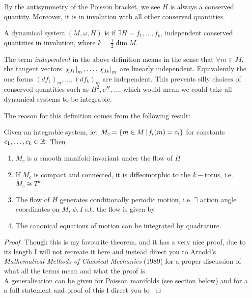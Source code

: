 \documentclass{article}
\begin{document}
\begin{example}
By the antisymmetry of the Poisson bracket, we see $H$ is always a conserved quantity. Moreover, it is in involution with all other conserved quantities. 
\end{example}

\begin{definition}[Integrable]
A dynamical system $(M,\omega,H)$ is  if $\exists H=f_1, \dots, f_k$, independent conserved quantities in involution, where $k= \frac{1}{2}\dim M$.
\end{definition}

\begin{remark}
The term \textit{independent} in the above definition means in the sense that $\forall m \in M$, the tangent vectors $\left. \chi_{f_1} \right\rvert_{m}, \dots, \left. \chi_{f_k} \right\rvert_{m} $ are linearly independent. Equivalently the one forms $(df_1)_m, \dots, (df_k)_m$ are independent. This prevents silly choices of conserved quantities such as $H^2, e^H, \dots$, which would mean we could take all dynamical systems to be integrable. 
\end{remark}

The reason for this definition comes from the following result:

\begin{theorem}
Given an integrable system, let $M_c = \left\{ m \in M \, | \, f_i(m) = c_i \right\}$ for constants $c_1, \dots, c_k \in \mathbb{R}$. Then 
\begin{enumerate}
    \item $M_c$ is a smooth manifold invariant under the flow of $H$
    \item If $M_c$ is compact and connected, it is diffeomorphic to the $k-$torus, i.e. $M_c \cong T^k$
    \item The flow of $H$ generates conditionally periodic motion, i.e. $\exists$ action angle coordinates on $M$, $\phi,I$ s.t. the flow is given by 
    \item The canonical equations of motion can be integrated by quadrature.
\end{enumerate}
\end{theorem}
\begin{proof}
Though this is my favourite theorem, and it has a very nice proof, due to its length I will not recreate it here and instead direct you to Arnold's \textit{Mathematical Methods of Classical Mechanics} (1989) for a proper discussion of what all the terms mean and what the proof is. \\
A generalisation can be given for Poisson manifolds (see section below) and for a a full statement and proof of this I direct you to \cite{Laurent-Gengoux2011}
\end{proof}
\end{document}

